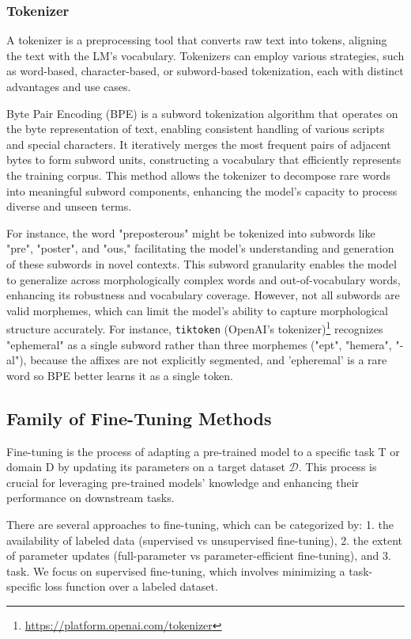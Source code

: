 \subsubsection{Tokenizer} \label{app:tokenizer}

A tokenizer is a preprocessing tool that converts raw text into tokens, aligning the text with the LM's vocabulary. Tokenizers can employ various strategies, such as word-based, character-based, or subword-based tokenization, each with distinct advantages and use cases.

Byte Pair Encoding (BPE) is a subword tokenization algorithm that operates on the byte representation of text, enabling consistent handling of various scripts and special characters. It iteratively merges the most frequent pairs of adjacent bytes to form subword units, constructing a vocabulary that efficiently represents the training corpus. This method allows the tokenizer to decompose rare words into meaningful subword components, enhancing the model's capacity to process diverse and unseen terms.

For instance, the word "preposterous" might be tokenized into subwords like "pre", "poster", and "ous," facilitating the model's understanding and generation of these subwords in novel contexts. This subword granularity enables the model to generalize across morphologically complex words and out-of-vocabulary words, enhancing its robustness and vocabulary coverage. However, not all subwords are valid morphemes, which can limit the model's ability to capture morphological structure accurately. For instance, \texttt{tiktoken} (OpenAI's tokenizer)\footnote{\href{https://platform.openai.com/tokenizer}{https://platform.openai.com/tokenizer}} recognizes "ephemeral" as a single subword rather than three morphemes ("ept", "hemera", "-al"), because the affixes are not explicitly segmented, and 'epheremal' is a rare word so BPE better learns it as a single token.

\subsection{Family of Fine-Tuning Methods} \label{app:finetuning}
Fine-tuning is the process of adapting a pre-trained model to a specific task T or domain D by updating its parameters on a target dataset \(\mathcal{D}\). This process is crucial for leveraging pre-trained models' knowledge and enhancing their performance on downstream tasks.

There are several approaches to fine-tuning, which can be categorized by: 1. the availability of labeled data (supervised vs unsupervised fine-tuning), 2. the extent of parameter updates (full-parameter vs parameter-efficient fine-tuning), and 3. task. We focus on supervised fine-tuning, which involves minimizing a task-specific loss function over a labeled dataset.

